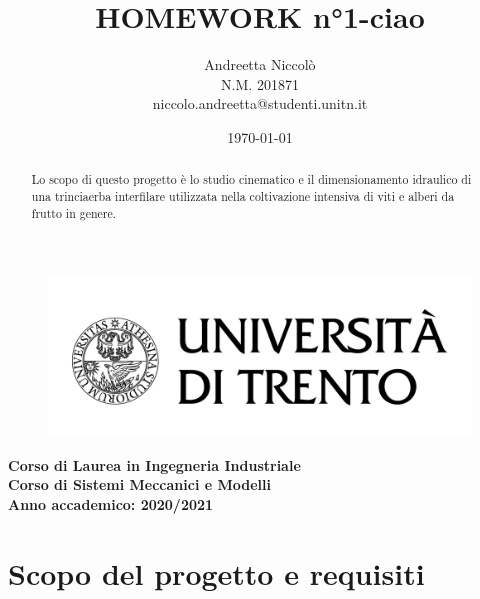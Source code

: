 \documentclass[a4paper,12pt]{article}
\title{\textbf{HOMEWORK n°1-ciao}}
\author{Andreetta Niccolò\\
N.M. 201871\\
niccolo.andreetta@studenti.unitn.it
}
\date{\today}
\begin{document}
\begin{figure}[H]
    \centering
    \includegraphics[scale=0.15]{immagini/logo-unitn.png}
    \maketitle
\end{figure}
\begin{center}\textbf{
    Corso di Laurea in Ingegneria Industriale\\
    Corso di {Sistemi Meccanici e Modelli}\\
    Anno accademico: 2020/2021}
\vspace{2cm}
\begin{abstract}\centering
Lo scopo di questo progetto è lo studio cinematico e il dimensionamento idraulico di una trinciaerba interfilare utilizzata nella coltivazione intensiva di viti e alberi da frutto in genere.
\end{abstract}
\end{center}
\thispagestyle{empty}
\newpage
\tableofcontents
\listoffigures
\thispagestyle{empty}
\newpage
\setcounter{page}{3}
\section{Scopo del progetto e requisiti }
\end{document}
